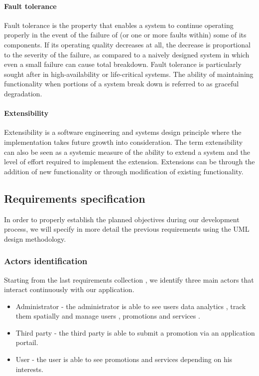\paragraph{Fault tolerance}
\label{sec:sec01}
Fault tolerance is the property that enables a system to continue operating properly in the event of the failure 
of (or one or more faults within) some of its components. If its operating quality decreases at all, the decrease
 is proportional to the severity of the failure, as compared to a naively designed system in which even a small 
 failure can cause total breakdown. Fault tolerance is particularly sought after in high-availability or life-critical
  systems. The ability of maintaining functionality when portions of a system break down is referred to as graceful 
  degradation.

 \paragraph{Extensibility}
\label{sec:sec01}
Extensibility is a software engineering and systems design principle where the implementation takes 
future growth into consideration. The term extensibility can also be seen as a systemic measure of the 
ability to extend a system and the level of effort required to implement the extension. Extensions can be through 
the addition of new functionality or through modification of existing functionality.

\subsection{Requirements specification}
\label{sec:sec01}
In order to properly establish the planned objectives during our development process, we will specify in more detail
the previous requirements using the UML design methodology.
\subsubsection{Actors identification}
\label{sec:sec01}
Starting from the last requirements collection , we identify three main actors that 
interact continuously with our application.
\begin{itemize}
  \item Administrator - the administrator is able to see users data analytics , track them spatially and manage users
   , promotions and services .
  \item Third party - the third party is able to submit a promotion via an application portail.
  \item User - the user is able to see promotions and services depending on his interests.
\end{itemize}

